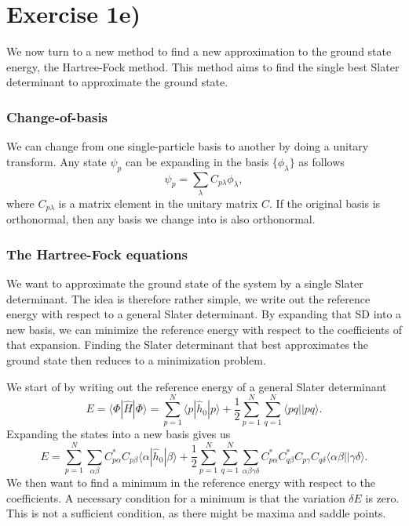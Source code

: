 \documentclass[a4paper, 11pt, notitlepage, english]{article}
\newcommand{\braket}[2]{\langle #1 | #2 \rangle}
\newcommand{\op}[1]{\hat{#1}}
\newcommand{\braopket}[3]{\langle #1 | {#2} | #3 \rangle}
\begin{document}
\clearpage

\section*{Exercise 1e)}
We now turn to a new method to find a new approximation to the ground state energy, the Hartree-Fock method. This method aims to find the single best Slater determinant to approximate the ground state. 

\subsubsection*{Change-of-basis}
We can change from one single-particle basis to another by doing a unitary transform. Any state $\psi_p$ can be expanding in the basis $\{\phi_\lambda\}$ as follows
$$\psi_p = \sum_\lambda C_{p\lambda} \phi_\lambda,$$
where $C_{p\lambda}$ is a matrix element in the unitary matrix $C$. If the original basis is orthonormal, then any basis we change into is also orthonormal.

\subsubsection*{The Hartree-Fock equations}
We want to approximate the ground state of the system by a single Slater determinant. The idea is therefore rather simple, we write out the reference energy with respect to a general Slater determinant. By expanding that SD into a new basis, we can minimize the reference energy with respect to the coefficients of that expansion. Finding the Slater determinant that best approximates the ground state then reduces to a minimization problem.

We start of by writing out the reference energy of a general Slater determinant
$$E = \braopket{\Phi}{\op{H}}{\Phi} = \sum_{p=1}^N \braopket{p}{\op{h}_0}{p} + \frac{1}{2}\sum_{p=1}^N\sum_{q=1}^N\braket{pq|}{pq}.$$
Expanding the states into a new basis gives us 
$$E = \sum_{p=1}^N \sum_{\alpha \beta} C^*_{p \alpha} C_{p \beta}\braopket{\alpha}{\op{h}_0}{\beta} + \frac{1}{2}\sum_{p=1}^N\sum_{q=1}^N\sum_{\alpha\beta\gamma\delta} C_{p\alpha}^* C_{q \beta}^* C_{p \gamma} C_{q \delta} \braket{\alpha\beta|}{\gamma\delta}.$$
We then want to find a minimum in the reference energy with respect to the coefficients. A necessary condition for a minimum is that the variation $\delta E$ is zero. This is not a sufficient condition, as there might be maxima and saddle points.
\end{document}
